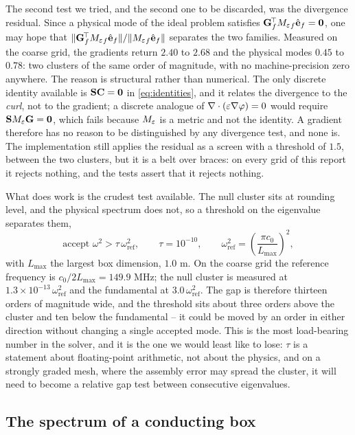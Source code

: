 The second test we tried, and the second one to be discarded, was the divergence residual. Since a
physical mode of the ideal problem satisfies $\mathbf{G}_f^{\!\top}{M_{\varepsilon}}_f\hat{\mathbf{e}}_f=\mathbf{0}$,
one may hope that $\|\mathbf{G}_f^{\!\top}{M_{\varepsilon}}_f\hat{\mathbf{e}}_f\|/\|{M_{\varepsilon}}_f\hat{\mathbf{e}}_f\|$
separates the two families. Measured on the coarse grid, the gradients return $2.40$ to $2.68$ and
the physical modes $0.45$ to $0.78$: two clusters of the same order of magnitude, with no
machine-precision zero anywhere. The reason is structural rather than numerical. The only discrete
identity available is $\mathbf{S}\mathbf{C}=\mathbf{0}$ in \eqref{eq:identities}, and it relates the
divergence to the \emph{curl}, not to the gradient; a discrete analogue of
$\nabla\cdot(\varepsilon\nabla\varphi)=0$ would require $\mathbf{S}{M_{\varepsilon}}\mathbf{G}=\mathbf{0}$, which fails because
${M_{\varepsilon}}$ is a metric and not the identity. A gradient therefore has no reason to be distinguished by
any divergence test, and none is. The implementation still applies the residual as a screen with a
threshold of $1.5$, between the two clusters, but it is a belt over braces: on every grid of this
report it rejects nothing, and the tests assert that it rejects nothing.

What does work is the crudest test available. The null cluster sits at rounding level, and the
physical spectrum
does not, so a threshold on the eigenvalue separates them,
\begin{equation}
  \text{accept } \omega^{2} > \tau\,\omega^{2}_{\mathrm{ref}}, \qquad \tau=10^{-10}, \qquad
  \omega^{2}_{\mathrm{ref}} = \left(\frac{\pi c_0}{L_{\max}}\right)^{2},
  \label{eq:cut}
\end{equation}
with $L_{\max}$ the largest box dimension, $1.0$ m. On the coarse grid the reference frequency is
$c_0/2L_{\max}=149.9$ MHz; the null cluster is measured at
$1.3\times10^{-13}\,\omega^{2}_{\mathrm{ref}}$ and the
fundamental at $3.0\,\omega^{2}_{\mathrm{ref}}$. The gap is therefore thirteen orders of magnitude
wide, and the
threshold sits about three orders above the cluster and ten below the fundamental -- it could be
moved by an
order in either direction without changing a single accepted mode. This is the most load-bearing
number in the
solver, and it is the one we would least like to lose: $\tau$ is a statement about floating-point
arithmetic, not
about the physics, and on a strongly graded mesh, where the assembly error may spread the cluster,
it will need
to become a relative gap test between consecutive eigenvalues.

\subsection{The spectrum of a conducting box} \label{sec:spectrum}

